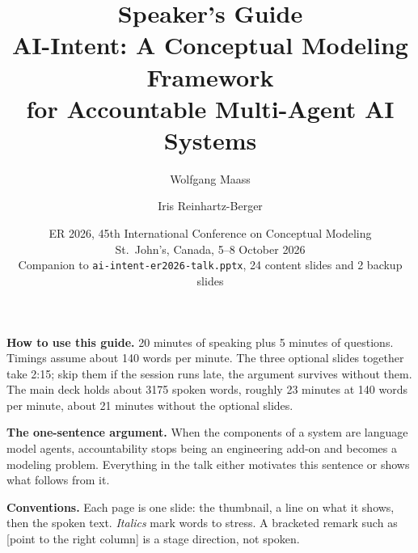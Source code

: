 \documentclass[17pt,a4paper]{extarticle}
\title{\color{uds}\textbf{Speaker's Guide}\\[4pt]
\large AI-Intent: A Conceptual Modeling Framework\\for Accountable Multi-Agent AI Systems}
\author{Wolfgang Maass \and Iris Reinhartz-Berger}
\date{\normalsize ER 2026, 45th International Conference on Conceptual Modeling\\
St.\ John's, Canada, 5--8 October 2026\\[6pt]
\small Companion to \texttt{ai-intent-er2026-talk.pptx}, 24 content slides and 2 backup slides}
\begin{document}
\maketitle

\textbf{How to use this guide.} 20 minutes of speaking plus 5 minutes of questions. Timings assume about 140 words per minute. The three optional slides together take 2:15; skip them if the session runs late, the argument survives without them. The main deck holds about 3175 spoken words, roughly 23 minutes at 140 words per minute, about 21 minutes without the optional slides.

\textbf{The one-sentence argument.} When the components of a system are language model agents, accountability stops being an engineering add-on and becomes a modeling problem. Everything in the talk either motivates this sentence or shows what follows from it.

\textbf{Conventions.} Each page is one slide: the thumbnail, a line on what it shows, then the spoken text. \emph{Italics} mark words to stress. A bracketed remark such as [point to the right column] is a stage direction, not spoken.

\clearpage
\end{document}
